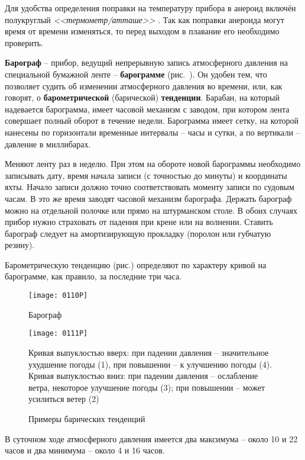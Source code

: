 Для удобства определения поправки на температуру прибора в анероид
включён полукруглый \textit{<<термометр\-/атташе>>}
. Так как поправки анероида могут время от
времени изменяться, то перед выходом в плавание его необходимо
проверить.

\textbf{Барограф} \--- прибор, ведущий непрерывную запись атмосферного
давления на специальной бумажной ленте \--- \textbf{барограмме}
(рис.~). Он удобен тем, что позволяет судить об изменении
атмосферного давления во времени, или, как говорят, о
\textbf{барометрической}
 (барической) \textbf{тенденции}. Барабан, на
который надевается барограмма, имеет часовой механизм с заводом, при
котором лента совершает полный оборот в течение недели. Барограмма
имеет сетку, на которой нанесены по горизонтали временные интервалы
\--- часы и сутки, а по вертикали \--- давление в миллибарах.

Меняют ленту раз в неделю. При этом на обороте новой барограммы
необходимо записывать дату, время начала записи (с точностью до
минуты) и координаты яхты. Начало записи должно точно соответствовать
моменту записи по судовым часам. В это же время заводят часовой
механизм барографа. Держать барограф можно на отдельной полочке или
прямо на штурманском столе. В обоих случаях прибор нужно страховать от
падения при крене или на волнении. Ставить барограф следует на
амортизирующую прокладку (поролон или губчатую резину).

Барометрическую тенденцию (рис.) определяют по характеру
кривой на барограмме, как правило, за последние три часа.

\begin{figure*}
  \centering{}
  \texttt{[image: 0110P]}
  \caption{Барограф }
  \label{fig:110}
\end{figure*}

\begin{figure*}
  \centering{}
  \texttt{[image: 0111P]}
  \caption{Примеры барических тенденций}
  \label{fig:111}
  \small \centering{} Кривая выпуклостью вверх: при падении давления
  \--- значительное ухудшение погоды (1), при повышении \--- к
  улучшению погоды (4). Кривая выпуклостью вниз: при падении давления
  \--- ослабление ветра, некоторое улучшение погоды (3); при повышении
  \--- может усилиться ветер (2)
\end{figure*}

В суточном ходе атмосферного давления имеется два максимума \--- около
10 и 22 часов и два минимума \--- около 4 и 16 часов.

